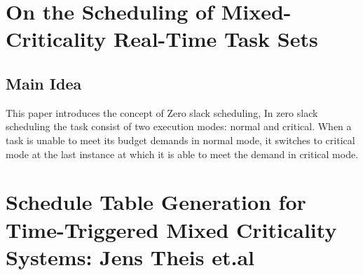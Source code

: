 \section{On the Scheduling of Mixed-Criticality Real-Time Task Sets}

\subsection*{Main Idea}
This paper introduces the concept of Zero slack scheduling, In zero slack scheduling the task consist of two execution modes: normal and critical. When a task is unable to meet its budget demands in normal mode, it switches to critical mode at the last instance at which it is able to meet the demand in critical mode.

\section{Schedule Table Generation for Time-Triggered Mixed Criticality Systems: Jens Theis et.al}

